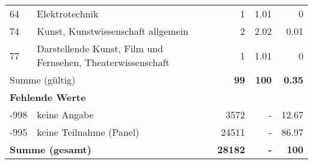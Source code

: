\begin{longtable}{lXrrr}
        64 & \multicolumn{1}{X}{Elektrotechnik} & %
          \num{1} &
          \num[round-mode=places,round-precision=2]{1,01} &
          \num[round-mode=places,round-precision=2]{0} \\

        74 & \multicolumn{1}{X}{Kunst, Kunstwissenschaft allgemein} & %
          \num{2} &
          \num[round-mode=places,round-precision=2]{2,02} &
          \num[round-mode=places,round-precision=2]{0,01} \\

        77 & \multicolumn{1}{X}{Darstellende Kunst, Film und Fernsehen, Theaterwissenschaft} & %
          \num{1} &
          \num[round-mode=places,round-precision=2]{1,01} &
          \num[round-mode=places,round-precision=2]{0} \\

     \midrule
     \multicolumn{2}{l}{Summe (gültig)} &
       \textbf{\num{99}} &
     \textbf{100} &
       \textbf{\num[round-mode=places,round-precision=2]{0,35}} \\
     \multicolumn{5}{l}{\textbf{Fehlende Werte}}\\
       -998 &
       keine Angabe &
         \num{3572} &
        - &
         \num[round-mode=places,round-precision=2]{12,67} \\
       -995 &
       keine Teilnahme (Panel) &
         \num{24511} &
        - &
         \num[round-mode=places,round-precision=2]{86,97} \\
     \midrule
     \multicolumn{2}{l}{\textbf{Summe (gesamt)}} &
          \textbf{\num{28182}} &
        \textbf{-} &
        \textbf{100} \\
     \bottomrule
     \end{longtable}
     
